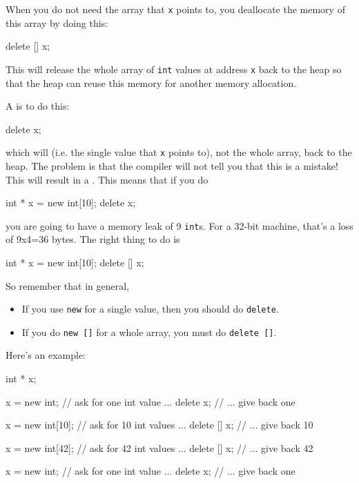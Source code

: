When you do not need the array that \texttt{x} points to, you deallocate
the memory of this array by doing this:

\begin{consolethree}[escapeinside=||]
delete [] x;
\end{consolethree}

This will release the whole array of \texttt{int} values at address \texttt{x} back to the heap so that the heap can reuse this memory for another memory allocation.

A  is to do this:

\begin{consolethree}[escapeinside=||]
delete x;
\end{consolethree}

which will  (i.e. the single value that \texttt{x} points to), not the whole array, back to the heap. The problem is that the compiler will not tell you that this is a mistake! This will result in a . This means that if you do

\begin{consolethree}[escapeinside=||]
int * x = new int[10];
delete x;
\end{consolethree}

you are going to have a memory leak of 9 \texttt{int}s. For a 32-bit
machine, that's a loss of 9x4=36 bytes. The right thing
to do is

\begin{consolethree}[escapeinside=||]
int * x = new int[10];
delete [] x;
\end{consolethree}

So remember that in general,

\begin{itemize}
\item If you use \texttt{new} for a single value, then you should do
  \texttt{delete}.
\item If you do \texttt{new []} for a whole array, you must do
  \texttt{delete []}.
\end{itemize}

Here's an example:

\begin{consolethree}[escapeinside=||]
int * x;

x = new int;     // ask for one int value ...
delete x;        // ... give back one

x = new int[10]; // ask for 10 int values ...
delete [] x;     // ... give back 10

x = new int[42]; // ask for 42 int values ...
delete [] x;     // ... give back 42

x = new int;     // ask for one int value ...
delete x;        // ... give back one
\end{consolethree}

